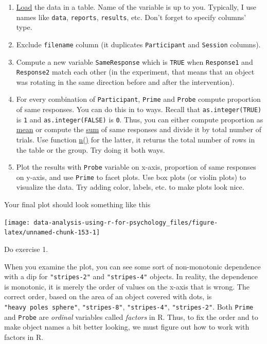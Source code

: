 \documentclass[
]{book}
\providecommand{\tightlist}{%
  \setlength{\itemsep}{0pt}\setlength{\parskip}{0pt}}
\begin{document}
\begin{enumerate}
\def\labelenumi{\arabic{enumi}.}
\tightlist
\item
  \protect\hyperlink{readr}{Load} the data in a table. Name of the variable is up to you. Typically, I use names like \texttt{data}, \texttt{reports}, \texttt{results}, etc. Don't forget to specify columns' type.
\item
  Exclude \texttt{filename} column (it duplicates \texttt{Participant} and \texttt{Session} columns).
\item
  Compute a new variable \texttt{SameResponse} which is \texttt{TRUE} when \texttt{Response1} and \texttt{Response2} match each other (in the experiment, that means that an object was rotating in the same direction before and after the intervention).
\item
  For every combination of \texttt{Participant}, \texttt{Prime} and \texttt{Probe} compute proportion of same responses. You can do this in to ways. Recall that \texttt{as.integer(TRUE)} is \texttt{1} and \texttt{as.integer(FALSE)} is \texttt{0}. Thus, you can either compute proportion as \href{https://stat.ethz.ch/R-manual/R-patched/library/base/html/mean.html}{mean} or compute the \href{https://stat.ethz.ch/R-manual/R-patched/library/base/html/sum.html}{sum} of same responses and divide it by total number of trials. Use function \href{https://dplyr.tidyverse.org/reference/n.html}{n()} for the latter, it returns the total number of rows in the table or the group. Try doing it both ways.
\item
  Plot the results with \texttt{Probe} variable on x-axis, proportion of same responses on y-axis, and use \texttt{Prime} to facet plots. Use box plots (or violin plots) to visualize the data. Try adding color, labels, etc. to make plots look nice.
\end{enumerate}

Your final plot should look something like this

\begin{center}\texttt{[image: data-analysis-using-r-for-psychology\_files/figure-latex/unnamed-chunk-153-1]} \end{center}

Do exercise 1.

When you examine the plot, you can see some sort of non-monotonic dependence with a dip for \texttt{"stripes-2"} and \texttt{"stripes-4"} objects. In reality, the dependence is monotonic, it is merely the order of values on the x-axis that is wrong. The correct order, based on the area of an object covered with dots, is \texttt{"heavy\ poles\ sphere"}, \texttt{"stripes-8"}, \texttt{"stripes-4"}, \texttt{"stripes-2"}. Both \texttt{Prime} and \texttt{Probe} are \emph{ordinal} variables called \emph{factors} in R. Thus, to fix the order and to make object names a bit better looking, we must figure out how to work with factors in R.
\end{document}

